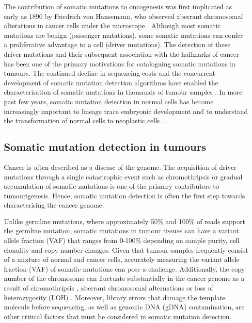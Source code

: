 The contribution of somatic mutations to oncogenesis was first implicated as early as 1890 by Friedrich von Hansemann, who observed aberrant chromosomal alterations in cancer cells under the microscope \cite{hansemann_1890}. Although most somatic mutations are benign (passenger mutations), some somatic mutations can confer a proliferative advantage to a cell (driver mutations). The detection of these driver mutations and their subsequent association with the hallmarks of cancer \cite{Hanahan2000-dp, Hanahan2011-zr} has been one of the primary motivations for cataloguing somatic mutations in tumours. The continued decline in sequencing costs and the concurrent development of somatic mutation detection algorithms have enabled the characterisation of somatic mutations in thousands of tumour samples \cite{Weinstein2013-ko, ICGCTCGA_Pan-Cancer_Analysis_of_Whole_Genomes_Consortium2020-ts}. In more past few years, somatic mutation detection in normal cells has become increasingly important to lineage trace embryonic development \cite{Behjati2014-gb} and to understand the transformation of normal cells to neoplastic cells \cite{Martincorena2015-io}. 

\subsection{Somatic mutation detection in tumours}
\label{sec:somatic_mutation_detection_in_tumours}

Cancer is often described as a disease of the genome. The acquisition of driver mutations through a single catastrophic event such as chromothripsis \cite{Stephens2011-gj} or gradual accumulation of somatic mutations \cite{Doll1954-of, Knudson1971-fg} is one of the primary contributors to tumourigenesis. Hence, somatic mutation detection is often the first step towards characterising the cancer genome. 

Unlike germline mutations, where approximately 50\% and 100\% of reads support the germline mutation, somatic mutations in tumour tissues can have a variant allele fraction (VAF) that ranges from 0-100\% depending on sample purity, cell clonality and copy number changes. Given that tumour samples frequently consist of a mixture of normal and cancer cells, accurately measuring the variant allele fraction (VAF) of somatic mutations can pose a challenge. Additionally, the copy number of the chromosome can fluctuate substantially in the cancer genome as a result of chromothripsis \cite{Stephens2011-gj}, aberrant chromosomal alternations \cite{Albertson2003-lr, Frohling2008-uc} or loss of heterozygosity (LOH) \cite{Lasko1991-wq}. Moreover, library errors that damage the template molecule before sequencing, as well as genomic DNA (gDNA) contamination, are other critical factors that must be considered in somatic mutation detection.

